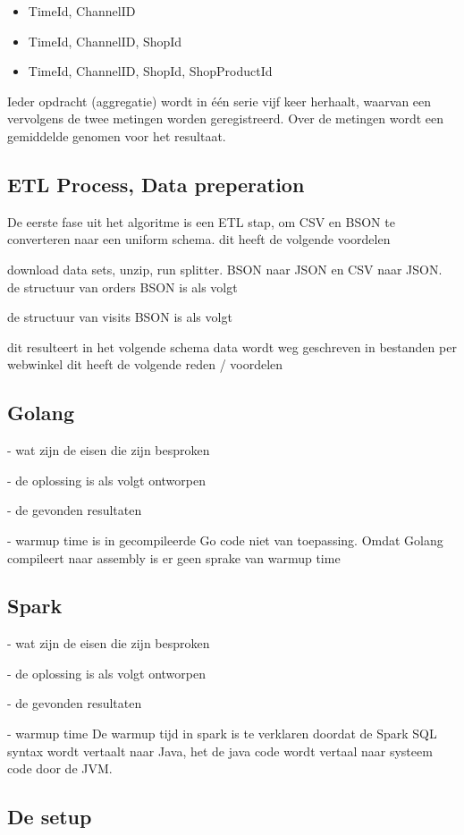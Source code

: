 \begin{itemize}
    \item TimeId, ChannelID
    \item TimeId, ChannelID, ShopId
    \item TimeId, ChannelID, ShopId, ShopProductId
\end{itemize}

Ieder opdracht (aggregatie) wordt in één serie vijf keer herhaalt, waarvan een vervolgens de twee metingen worden geregistreerd. Over de metingen wordt een gemiddelde genomen voor het resultaat.

\subsection{ETL Process, Data preperation}

De eerste fase uit het algoritme is een ETL stap, om CSV en BSON te converteren naar een uniform schema.
dit heeft de volgende voordelen

download data sets, unzip, run splitter. BSON naar JSON en CSV naar JSON.
de structuur van orders BSON is als volgt

de structuur van visits BSON is als volgt

dit resulteert in het volgende schema
data wordt weg geschreven in bestanden per webwinkel
dit heeft de volgende reden / voordelen


\subsection{Golang}

- wat zijn de eisen die zijn besproken

- de oplossing is als volgt ontworpen

- de gevonden resultaten

- warmup time is in gecompileerde Go code niet van toepassing.
Omdat Golang compileert naar assembly is er geen sprake van warmup time

\subsection{Spark}

- wat zijn de eisen die zijn besproken

- de oplossing is als volgt ontworpen

- de gevonden resultaten

- warmup time
De warmup tijd in spark is te verklaren doordat de Spark SQL syntax wordt vertaalt naar Java, het de java code wordt vertaal naar systeem code door de JVM.


\subsection{De setup}
\label{subsec:3.4hardware_specs}







